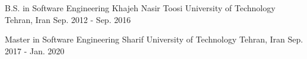 

\begin{cventries}

  \cventry
    {B.S. in Software Engineering} %
    {Khajeh Nasir Toosi University of Technology} %
    {Tehran, Iran} %
    {Sep. 2012 - Sep. 2016} %



\cventry
{Master in Software Engineering} %
{Sharif University of Technology} %
{Tehran, Iran} %
{Sep. 2017 - Jan. 2020} %

\end{cventries}
